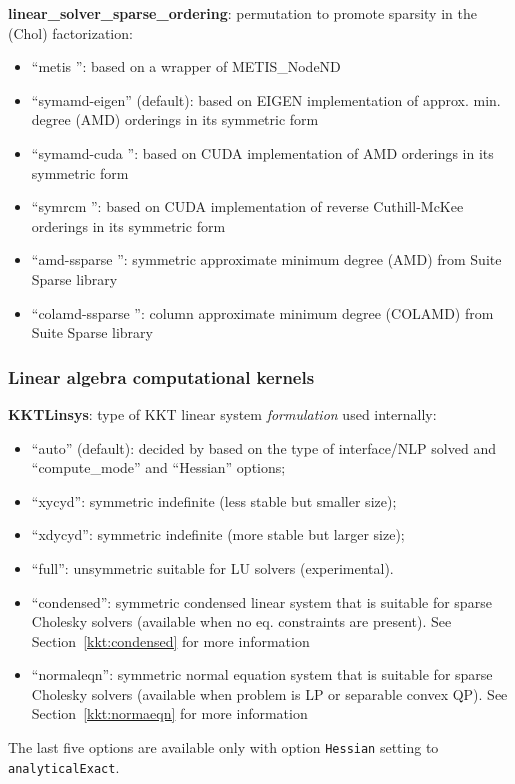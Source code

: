 \noindent \textbf{linear\_solver\_sparse\_ordering}: permutation to promote sparsity in the (Chol) factorization:
\begin{itemize}
\item ``metis '': based on a wrapper of METIS\_NodeND
\item ``symamd-eigen'' (default): based on EIGEN implementation of approx. min. degree (AMD) orderings in its symmetric form
\item ``symamd-cuda '': based on CUDA implementation of AMD orderings in its symmetric form
\item ``symrcm '': based on CUDA implementation of reverse Cuthill-McKee orderings in its symmetric form
\item ``amd-ssparse '': symmetric approximate minimum degree (AMD) from Suite Sparse library
\item ``colamd-ssparse '': column approximate minimum degree (COLAMD) from Suite Sparse library
\end{itemize}
\medskip



\subsubsection{Linear algebra computational kernels}

\noindent \textbf{KKTLinsys}: type of KKT linear system \textit{formulation} used internally:
\begin{itemize}
\item ``auto'' (default): decided by \Hi based on the type of interface/NLP solved and ``compute\_mode'' and ``Hessian'' options;
\item ``xycyd'': symmetric indefinite (less stable but smaller size);
\item ``xdycyd'': symmetric indefinite (more stable but  larger size);
\item  ``full'': unsymmetric suitable for LU solvers (experimental).
\item  ``condensed'': symmetric condensed linear system that is suitable for sparse Cholesky solvers (available when no eq. constraints are present). See Section~\ref{kkt:condensed} for more information
\item  ``normaleqn'': symmetric normal equation system that is suitable for sparse Cholesky solvers (available when problem is LP or separable convex QP). See Section~\ref{kkt:normaeqn} for more information
\end{itemize}
The last five options are available only with option \texttt{Hessian} setting to \texttt{analyticalExact}.
\medskip

